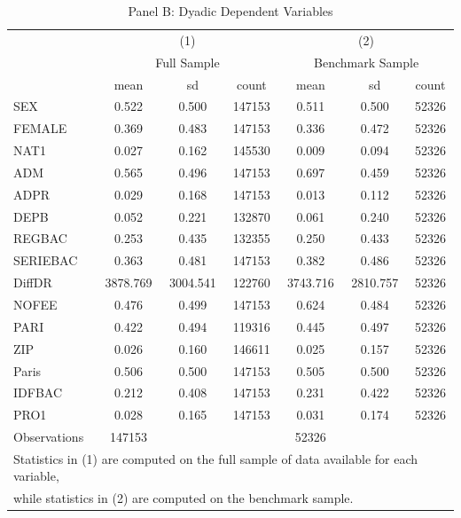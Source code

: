 \begin{table}[htbp]\centering
\def\sym#1{\ifmmode^{#1}\else\(^{#1}\)\fi}
\caption{Panel B: Dyadic Dependent Variables}
\begin{tabular}{l*{2}{ccc}}
\toprule
                    &\multicolumn{3}{c}{(1)}               &\multicolumn{3}{c}{(2)}               \\
                    &\multicolumn{3}{c}{Full Sample}       &\multicolumn{3}{c}{Benchmark Sample}  \\
                    &        mean&          sd&       count&        mean&          sd&       count\\
\midrule
SEX                 &       0.522&       0.500&      147153&       0.511&       0.500&       52326\\
FEMALE              &       0.369&       0.483&      147153&       0.336&       0.472&       52326\\
NAT1                &       0.027&       0.162&      145530&       0.009&       0.094&       52326\\
ADM                 &       0.565&       0.496&      147153&       0.697&       0.459&       52326\\
ADPR                &       0.029&       0.168&      147153&       0.013&       0.112&       52326\\
DEPB                &       0.052&       0.221&      132870&       0.061&       0.240&       52326\\
REGBAC              &       0.253&       0.435&      132355&       0.250&       0.433&       52326\\
SERIEBAC            &       0.363&       0.481&      147153&       0.382&       0.486&       52326\\
DiffDR              &    3878.769&    3004.541&      122760&    3743.716&    2810.757&       52326\\
NOFEE               &       0.476&       0.499&      147153&       0.624&       0.484&       52326\\
PARI                &       0.422&       0.494&      119316&       0.445&       0.497&       52326\\
ZIP                 &       0.026&       0.160&      146611&       0.025&       0.157&       52326\\
Paris               &       0.506&       0.500&      147153&       0.505&       0.500&       52326\\
IDFBAC              &       0.212&       0.408&      147153&       0.231&       0.422&       52326\\
PRO1                &       0.028&       0.165&      147153&       0.031&       0.174&       52326\\
\midrule
Observations        &      147153&            &            &       52326&            &            \\
\bottomrule
\multicolumn{7}{l}{\footnotesize Statistics in (1) are computed on the full sample of data available for each variable,}\\
\multicolumn{7}{l}{\footnotesize while statistics in (2) are computed on the benchmark sample.}\\
\end{tabular}
\end{table}
